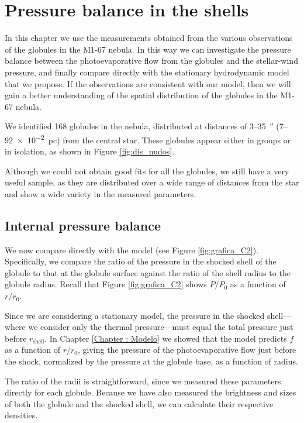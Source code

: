 \documentclass{book}
\begin{document}
\chapter{Pressure balance in the shells}\label{Ch : balance de presiones}

In this chapter we use the measurements obtained from the various
observations of the globules in the M1-67 nebula. In this way we can
investigate the pressure balance between the photoevaporative flow
from the globules and the stellar-wind pressure, and finally compare
directly with the stationary hydrodynamic model that we propose. If
the observations are consistent with our model, then we will gain a
better understanding of the spatial distribution of the globules in
the M1-67 nebula.

We identified 168 globules in the nebula, distributed at distances of
3--\SI{35}{\arcsecond} (7--\SI{92e-2}{pc}) from the central star.
These globules appear either in groups or in isolation, as shown in
Figure \ref{fig:dis_nudos}.

Although we could not obtain good fits for all the globules, we still
have a very useful sample, as they are distributed over a wide range
of distances from the star and show a wide variety in the measured
parameters.

\section{Internal pressure balance}\label{Sec : comparacion-modelo}

We now compare directly with the model (see Figure
\ref{fig:grafica_C2}). Specifically, we compare the ratio of the
pressure in the shocked shell of the globule to that at the globule
surface against the ratio of the shell radius to the globule radius.
Recall that Figure \ref{fig:grafica_C2} shows $P/P_0$ as a function of
$r/r_0$.

Since we are considering a stationary model, the pressure in the
shocked shell—where we consider only the thermal pressure—must equal
the total pressure just before $r_\mathrm{shell}$. In Chapter
\ref{Chapter : Modelo} we showed that the model predicts $f$ as a
function of $r/r_0$, giving the pressure of the photoevaporative flow
just before the shock, normalized by the pressure at the globule base,
as a function of radius.

The ratio of the radii is straightforward, since we measured these
parameters directly for each globule. Because we have also measured
the brightness and sizes of both the globule and the shocked shell, we
can calculate their respective densities.
\end{document}

